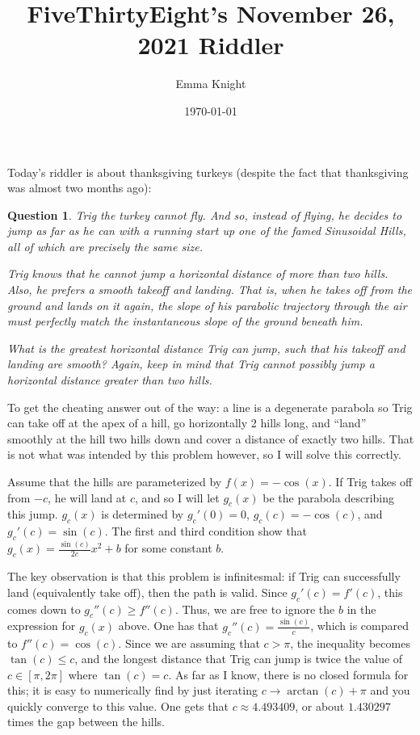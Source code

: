 \documentclass[11pt]{article}
\title{FiveThirtyEight's November 26, 2021 Riddler}
\author{Emma Knight}
\date{\today}
\newtheorem{question}[theorem]{Question}
\theoremstyle{definition}
\begin{document}
\maketitle
Today's riddler is about thanksgiving turkeys (despite the fact that thanksgiving was almost two months ago):
\begin{question}
Trig the turkey cannot fly. And so, instead of flying, he decides to jump as far as he can with a running start up one of the famed Sinusoidal Hills, all of which are precisely the same size.

Trig knows that he cannot jump a horizontal distance of more than two hills. Also, he prefers a smooth takeoff and landing. That is, when he takes off from the ground and lands on it again, the slope of his parabolic trajectory through the air must perfectly match the instantaneous slope of the ground beneath him.

What is the greatest horizontal distance Trig can jump, such that his takeoff and landing are smooth? Again, keep in mind that Trig cannot possibly jump a horizontal distance greater than two hills.
\end{question}

To get the cheating answer out of the way: a line is a degenerate parabola so Trig can take off at the apex of a hill, go horizontally 2 hills long, and ``land'' smoothly at the hill two hills down and cover a distance of exactly two hills.  That is not what was intended by this problem however, so I will solve this correctly.

Assume that the hills are parameterized by $f(x) = -\cos(x)$.  If Trig takes off from $-c$, he will land at $c$, and so I will let $g_c(x)$ be the parabola describing this jump.  $g_c(x)$ is determined by $g_c'(0) = 0$, $g_c(c) = -\cos(c)$, and $g_c'(c) = \sin(c)$.  The first and third condition show that $g_c(x) = \frac{\sin(c)}{2c}x^2 + b$ for some constant $b$.

The key observation is that this problem is infinitesmal: if Trig can successfully land (equivalently take off), then the path is valid.  Since $g_c'(c) = f'(c)$, this comes down to $g_c''(c) \geq f''(c)$.  Thus, we are free to ignore the $b$ in the expression for $g_c(x)$ above.  One has that $g_c''(c) = \frac{\sin(c)}{c}$, which is compared to $f''(c) = \cos(c)$.  Since we are assuming that $c > \pi$, the inequality becomes $\tan(c) \leq c$, and the longest distance that Trig can jump is twice the value of $c \in [\pi, 2\pi]$ where $\tan(c) = c$.  As far as I know, there is no closed formula for this; it is easy to numerically find by just iterating $c \rightarrow \arctan(c) + \pi$ and you quickly converge to this value.  One gets that $c \approx 4.493409$, or about $1.430297$ times the gap between the hills.
\end{document}
